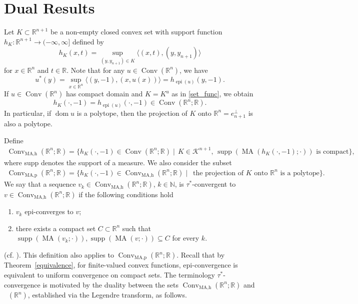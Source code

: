 \documentclass[11pt]{article}
\theoremstyle{definition} %
\newcommand{\RR}{(\mathbb{R}^n)}
\DeclareMathOperator{\Conv}{Conv}
\DeclareMathOperator{\dom}{dom}
\DeclareMathOperator{\MA}{MA}
\DeclareMathOperator{\MAh}{MA,h}
\DeclareMathOperator{\MAp}{MA,p}
\DeclareMathOperator{\epi}{epi}
\DeclareMathOperator{\LC}{Conv_{ld}}
\newcommand{\finite}{(\mathbb{R}^n; \mathbb{R})}
\DeclareMathOperator{\supp}{supp}
\begin{document}
\section{Dual Results}\label{dual results}
Let $K\subset\mathbb{R}^{n+1}$ be a non-empty closed convex set with support function
$h_K:\mathbb{R}^{n+1}\to (-\infty, \infty]$ defined by
$$h_{K}(x,t)=\sup_{(y,y_{n+1})\in K}\langle (x, t), (y,y_{n+1})\rangle$$
for $x\in \mathbb{R}^{n}$ and $t\in\mathbb{R}$. Note that  for any $u\in \Conv(\mathbb{R}^n)$, we have
\begin{equation}\label{minus}
    u^*(y)=\sup_{x\in\mathbb{R}^n}\langle (y, -1),(x,u(x))\rangle = h_{\epi(u)}(y,-1).
\end{equation}
If $u\in \Conv(\mathbb{R}^n)$ has compact domain and $K = K^u$ as in \eqref{set_func},  we obtain
\begin{equation}\label{minus*}
    h_{K}(\cdot,-1) = h_{\epi(u)}(\cdot,-1)\in \Conv\finite.
\end{equation}
In particular,  if $\dom u$ is a polytope, then the projection of $K$ onto $\mathbb{R}^n=e_{n+1}^{\perp}$ is also a polytope.




Define
\begin{align*}
    \Conv_{\MAh}\finite=
    \{h_{K}(\cdot, -1)\in\Conv\finite\mid \, K\in\mathcal{K}^{n+1},\, \supp(\MA(h_{K}(\cdot, -1);\cdot)) \text{ is compact}\},
\end{align*}
where supp denotes the support of a measure. We also consider the subset
\begin{align*}
    \Conv_{\MAp}\finite
    =
    \{h_{K}(\cdot, -1)\in \Conv_{\MAh}\finite\mid\,  \text{ the projection of $K$ onto $\mathbb{R}^n$ is a polytope}\}.
\end{align*}
We say that a sequence $v_k\in \Conv_{\MAh}\finite$, $k\in\mathbb{N}$,  is $\tau^*$-convergent to $v\in \Conv_{\MAh}\finite$ if the following conditions hold
\begin{enumerate}
\item[(i)] $v_k$ epi-converges to $v$;
\item[(ii)] there exists a compact set $C\subset\mathbb{R}^n$ such that $\supp(\MA(v_k;\cdot)),\supp(\MA(v;\cdot))\subseteq C$ for every $k$.
\end{enumerate}
(cf. \cite{baetaludwigsemicontinuity}). This definition also applies to $\Conv_{\MAp}\finite$.  Recall that by Theorem~\ref{equivalence}, for finite-valued convex functions, epi-convergence is equivalent to uniform convergence on compact sets. The terminology $\tau^*$-convergence is motivated by the duality between the sets $\Conv_{\MAh}\finite$ and $\LC\RR$, established via the Legendre transform, as follows.
\end{document}
